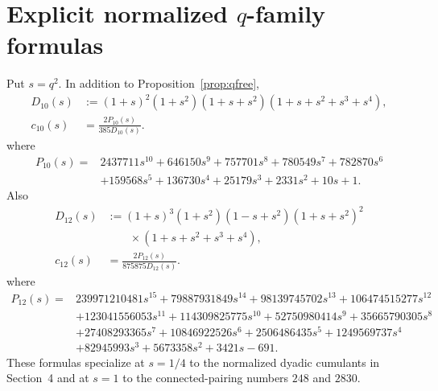 \documentclass[11pt,oneside]{article}
\theoremstyle{definition}
\theoremstyle{remark}
\begin{document}
\appendix
\section{Explicit normalized \texorpdfstring{\(q\)}{q}-family formulas}\label{app:qformulas}
Put \(s=q^2\). In addition to Proposition~\ref{prop:qfree},
\begin{align}
D_{10}(s)&:=(1+s)^2(1+s^2)(1+s+s^2)(1+s+s^2+s^3+s^4),\nonumber\\
c_{10}(s)&=\frac{2P_{10}(s)}{385D_{10}(s)}.\label{eq:c10full}
\end{align}
where
\begin{align*}
P_{10}(s)={}&2437711s^{10}+646150s^9+757701s^8+780549s^7+782870s^6\\
&+159568s^5+136730s^4+25179s^3+2331s^2+10s+1.
\end{align*}
Also
\begin{align}
D_{12}(s)&:=(1+s)^3(1+s^2)(1-s+s^2)(1+s+s^2)^2\nonumber\\
&\qquad\times(1+s+s^2+s^3+s^4),\nonumber\\
c_{12}(s)&=\frac{2P_{12}(s)}{875875D_{12}(s)}.\label{eq:c12full}
\end{align}
where
\begin{align*}
P_{12}(s)={}&239971210481s^{15}+79887931849s^{14}+98139745702s^{13}
+106474515277s^{12}\\
&+123041556053s^{11}+114309825775s^{10}+52750980414s^9
+35665790305s^8\\
&+27408293365s^7+10846922526s^6+2506486435s^5
+1249569737s^4\\
&+82945993s^3+5673358s^2+3421s-691.
\end{align*}
These formulas specialize at \(s=1/4\) to the normalized dyadic cumulants in Section~4 and at \(s=1\) to the connected-pairing numbers \(248\) and \(2830\).
\end{document}
